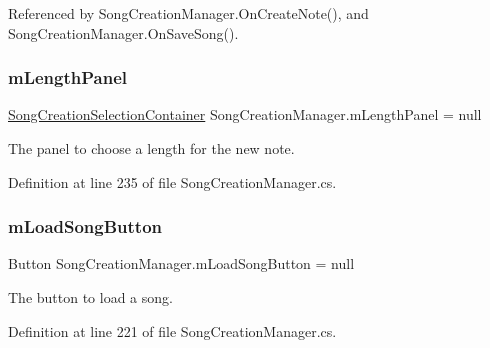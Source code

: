 Referenced by Song\+Creation\+Manager.\+On\+Create\+Note(), and Song\+Creation\+Manager.\+On\+Save\+Song().

\mbox{\label{group___s_c_m_priv_var_gadb8dedf80fbe474a1c94cdc95d088a6f}} 
\subsubsection{\texorpdfstring{m\+Length\+Panel}{mLengthPanel}}
{\footnotesize\ttfamily \hyperlink{group___s_c_m_nest_class_class_song_creation_manager_1_1_song_creation_selection_container}{Song\+Creation\+Selection\+Container} Song\+Creation\+Manager.\+m\+Length\+Panel = null\hspace{0.3cm}{\ttfamily [private]}}



The panel to choose a length for the new note. 



Definition at line 235 of file Song\+Creation\+Manager.\+cs.

\mbox{\label{group___s_c_m_priv_var_ga7851ecd194d87e14fa186fc76e154222}} 
\subsubsection{\texorpdfstring{m\+Load\+Song\+Button}{mLoadSongButton}}
{\footnotesize\ttfamily Button Song\+Creation\+Manager.\+m\+Load\+Song\+Button = null\hspace{0.3cm}{\ttfamily [private]}}



The button to load a song. 



Definition at line 221 of file Song\+Creation\+Manager.\+cs.

\mbox{\label{group___s_c_m_priv_var_gac17f83788e480bb97160d17bbe69aab3}} 
